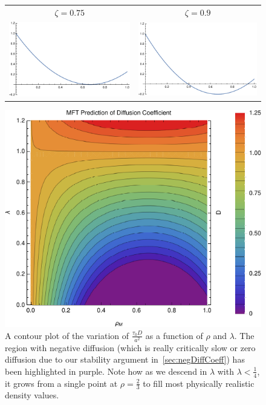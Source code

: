 \begin{figure}[h!]
\begin{center}
\begin{tabular}{c c}
     $\zeta = 0.75$  & $\zeta = 0.9$ \\
     \includegraphics[width=0.49\linewidth]{analytics/images/diffCoeffs/diffCoeff-0-75}  & \includegraphics[width=0.49 \linewidth]{analytics/images/diffCoeffs/diffCoeff-0-9} \\
    \end{tabular}
\end{center}
    \vspace{-2em}
\end{figure}

\begin{figure}[h!]
 \caption[A contour plot of the variation of the MFT diffusion coefficient with density and stickiness.]{\label{fig:diffCoeffDensityPlot} A contour plot of the variation of $\frac{\tau_0 D}{a^2}$ as a function of $\rho$ and $\lambda$. The region with negative diffusion (which is really critically slow or zero diffusion due
 to our stability argument in~\ref{sec:negDiffCoeff}) has been highlighted in purple. Note how as we descend in $\lambda$ with $\lambda<\frac{1}{4}$, it grows from a single point at $ \rho = \frac{2}{3}$
 to fill most physically realistic density values.}
 \includegraphics[width=0.99\linewidth]{analytics/images/newAnalFlow}
\end{figure}


